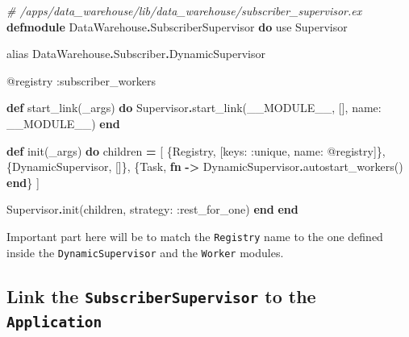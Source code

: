 \documentclass[
  oneside]{book}
\newenvironment{Shaded}{\begin{snugshade}}{\end{snugshade}}
\newcommand{\CommentTok}[1]{\textcolor[rgb]{0.56,0.35,0.01}{\textit{#1}}}
\newcommand{\ConstantTok}[1]{\textcolor[rgb]{0.00,0.00,0.00}{#1}}
\newcommand{\ImportTok}[1]{#1}
\newcommand{\KeywordTok}[1]{\textcolor[rgb]{0.13,0.29,0.53}{\textbf{#1}}}
\newcommand{\NormalTok}[1]{#1}
\newcommand{\OperatorTok}[1]{\textcolor[rgb]{0.81,0.36,0.00}{\textbf{#1}}}
\newcommand{\OtherTok}[1]{\textcolor[rgb]{0.56,0.35,0.01}{#1}}
\newcommand{\VariableTok}[1]{\textcolor[rgb]{0.00,0.00,0.00}{#1}}
\begin{document}
\begin{Shaded}
\begin{Highlighting}[]
\CommentTok{\# /apps/data\_warehouse/lib/data\_warehouse/subscriber\_supervisor.ex}
\KeywordTok{defmodule} \ConstantTok{DataWarehouse}\OperatorTok{.}\ConstantTok{SubscriberSupervisor} \KeywordTok{do}
  \ImportTok{use} \ConstantTok{Supervisor}

  \ImportTok{alias} \ConstantTok{DataWarehouse}\OperatorTok{.}\ConstantTok{Subscriber}\OperatorTok{.}\ConstantTok{DynamicSupervisor}

  \OtherTok{@registry} \VariableTok{:subscriber\_workers}

  \KeywordTok{def}\NormalTok{ start\_link(\_args) }\KeywordTok{do}
    \ConstantTok{Supervisor}\OperatorTok{.}\NormalTok{start\_link(}\ConstantTok{\_\_MODULE\_\_}\NormalTok{, [], }\VariableTok{name:} \ConstantTok{\_\_MODULE\_\_}\NormalTok{)}
  \KeywordTok{end}

  \KeywordTok{def}\NormalTok{ init(\_args) }\KeywordTok{do}
\NormalTok{    children }\OperatorTok{=}\NormalTok{ [}
\NormalTok{      \{}\ConstantTok{Registry}\NormalTok{, [}\VariableTok{keys:} \VariableTok{:unique}\NormalTok{, }\VariableTok{name:} \OtherTok{@registry}\NormalTok{]\},}
\NormalTok{      \{}\ConstantTok{DynamicSupervisor}\NormalTok{, []\},}
\NormalTok{      \{}\ConstantTok{Task}\NormalTok{,}
       \KeywordTok{fn} \OperatorTok{{-}\textgreater{}}
         \ConstantTok{DynamicSupervisor}\OperatorTok{.}\NormalTok{autostart\_workers()}
       \KeywordTok{end}\NormalTok{\}}
\NormalTok{    ]}

    \ConstantTok{Supervisor}\OperatorTok{.}\NormalTok{init(children, }\VariableTok{strategy:} \VariableTok{:rest\_for\_one}\NormalTok{)}
  \KeywordTok{end}
\KeywordTok{end}
\end{Highlighting}
\end{Shaded}

Important part here will be to match the \texttt{Registry} name to the one defined inside the \texttt{DynamicSupervisor} and the \texttt{Worker} modules.

\hypertarget{link-the-subscribersupervisor-to-the-application}{%
\subsection{\texorpdfstring{Link the \texttt{SubscriberSupervisor} to the \texttt{Application}}{Link the SubscriberSupervisor to the Application}}\label{link-the-subscribersupervisor-to-the-application}}
\end{document}
